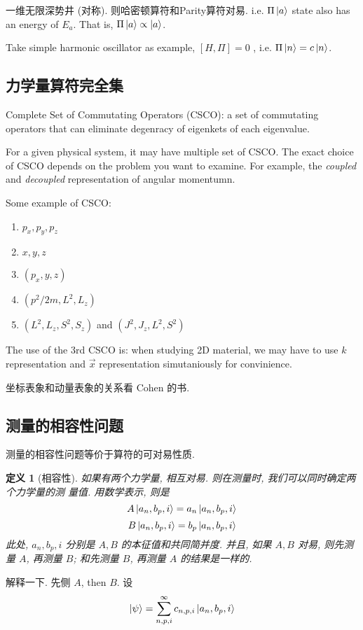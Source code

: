 \documentclass{ctexart}
\newtheorem{define}{定义}[section]
\begin{document}
一维无限深势井 (对称). 则哈密顿算符和Parity算符对易. i.e. $\Pi \ket{a}$ state
also has an energy of $E_a$. That is, $\Pi\ket{a}\propto \ket{a}$. 

Take simple harmonic oscillator as example, $[H,\Pi]=0$ , i.e. $\Pi\ket{n}
=c\ket{n}$. 

\subsection{力学量算符完全集}

Complete Set of Commutating Operators (CSCO): a set of commutating operators that can eliminate degenracy of eigenkets of each eigenvalue. 

For a given physical system, it may have multiple set of CSCO. The exact choice
of CSCO depends on the problem you want to examine. For example, the {\em
coupled} and {\em decoupled} representation of angular momentumn. 

Some example of CSCO:
\begin{enumerate}
	\item $p_x, p_y, p_z$ 
	\item $x, y, z$ 
	\item $(p_x, y, z)$
	\item $(p^2 / 2m, L^2, L_z)$
	\item $(L^2, L_z, S^2, S_z)$ and $(J^2, J_z, L^2, S^2)$
\end{enumerate}
The use of the 3rd CSCO is: when studying 2D material, we may have to use $k$
representation and $\vec{x}$ representation simutaniously for convinience. 

坐标表象和动量表象的关系看 Cohen 的书. 

\subsection{测量的相容性问题}

测量的相容性问题等价于算符的可对易性质. 

\begin{define}[相容性] 
	如果有两个力学量, 相互对易. 则在测量时, 我们可以同时确定两个力学量的测
	量值. 用数学表示, 则是 
	$$
	A \ket{a_n, b_p, i} = a_n \ket{a_n, b_p, i} 
	$$
	$$
	B \ket{a_n, b_p, i} = b_p \ket{a_n, b_p, i} 
	$$
	此处, $a_n, b_p, i$ 分别是 $A, B$ 的本征值和共同简并度. 
	并且, 如果 $A, B$ 对易, 则先测量 $A$, 再测量 $B$; 和先测量 $B$, 再测量
	$A$ 的结果是一样的. 
\end{define}

解释一下. 先侧 $A$, then $B$. 设 
$$
\ket{\psi} = \sum_{n,p,i}^{\infty}  c_{n,p,i}\ket{a_n, b_p, i} 
$$
\end{document}
